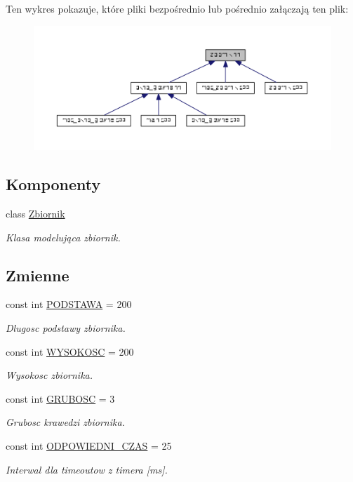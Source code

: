 Ten wykres pokazuje, które pliki bezpośrednio lub pośrednio załączają ten plik\+:
\nopagebreak
\begin{figure}[H]
\begin{center}
\leavevmode
\includegraphics[width=350pt]{zbiornik_8hh__dep__incl}
\end{center}
\end{figure}
\subsection*{Komponenty}
\begin{DoxyCompactItemize}
\item 
class \hyperlink{class_zbiornik}{Zbiornik}
\begin{DoxyCompactList}\small\item\em Klasa modelująca zbiornik. \end{DoxyCompactList}\end{DoxyCompactItemize}
\subsection*{Zmienne}
\begin{DoxyCompactItemize}
\item 
const int \hyperlink{zbiornik_8hh_acd3c5814c051e565bf7854f6403acf49}{P\+O\+D\+S\+T\+A\+W\+A} = 200
\begin{DoxyCompactList}\small\item\em Dlugosc podstawy zbiornika. \end{DoxyCompactList}\item 
const int \hyperlink{zbiornik_8hh_a073767f0ac7dbf009a42b00de1092b52}{W\+Y\+S\+O\+K\+O\+S\+C} = 200
\begin{DoxyCompactList}\small\item\em Wysokosc zbiornika. \end{DoxyCompactList}\item 
const int \hyperlink{zbiornik_8hh_a359a95636f17b8e9b7a01389d75b521d}{G\+R\+U\+B\+O\+S\+C} = 3
\begin{DoxyCompactList}\small\item\em Grubosc krawedzi zbiornika. \end{DoxyCompactList}\item 
const int \hyperlink{zbiornik_8hh_a3a09b0fc9bed85242f7783147af182ae}{O\+D\+P\+O\+W\+I\+E\+D\+N\+I\+\_\+\+C\+Z\+A\+S} = 25
\begin{DoxyCompactList}\small\item\em Interwal dla timeout\textquotesingle{}ow z timera \mbox{[}ms\mbox{]}. \end{DoxyCompactList}\end{DoxyCompactItemize}



